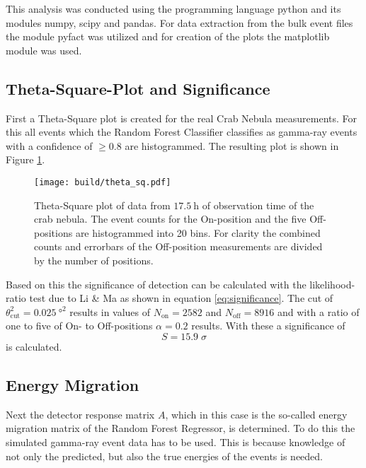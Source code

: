         This analysis was conducted using the programming language python and its modules numpy\cite{numpy}, scipy\cite{scipy} and pandas\cite{pandas}.
        For data extraction from the bulk event files the module pyfact was utilized and for creation of the plots the matplotlib\cite{matplotlib} module was used.
        \subsection{Theta-Square-Plot and Significance}
            First a Theta-Square plot is created for the real Crab Nebula measurements.
            For this all events which the Random Forest Classifier classifies as gamma-ray events with a confidence of $\geq \num{0.8}$ are histogrammed.
            The resulting plot is shown in Figure \ref{fig:theta_sq}.
            \begin{figure}
                \centering
                \texttt{[image: build/theta\_sq.pdf]}
                \caption{
                    Theta-Square plot of data from $\SI{17.5}{\hour}$ of observation time of the crab nebula.
                    The event counts for the On-position and the five Off-positions are histogrammed into 20 bins.
                    For clarity the combined counts and errorbars of the Off-position measurements are divided by the number of positions.
                }
                \label{fig:theta_sq}
            \end{figure}
            
            Based on this the significance of detection can be calculated with the likelihood-ratio test due to Li \& Ma \cite{significance} as shown in equation \eqref{eq:significance}.
            The cut of $\theta^2_\text{cut} = \SI{0.025}{\degree\squared}$ results in values of $N_\text{on} = 2582$ and $N_\text{off} = 8916$ and with a ratio of one to five of On- to Off-positions $\alpha = \num{0.2}$ results.
            With these a significance of
            \begin{equation}
                S = \num{15.9} \; \sigma
            \end{equation}
            is calculated.
            

        
        \subsection{Energy Migration}
            Next the detector response matrix $A$, which in this case is the so-called energy migration matrix of the Random Forest Regressor, is determined.
            To do this the simulated gamma-ray event data has to be used.
            This is because knowledge of not only the predicted, but also the true energies of the events is needed.
            

